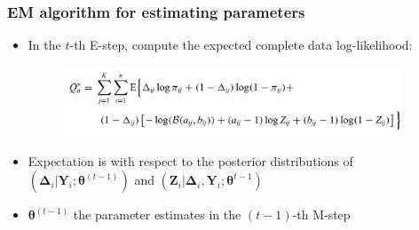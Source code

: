\documentclass{beamer}
\begin{document}
\begin{frame}
\frametitle{EM algorithm for estimating parameters}
\begin{itemize}
  \item In the $t$-th E-step, compute the expected complete data log-likelihood:
  \begin{figure}[!htb]
	\centering
	\includegraphics[width=0.95\textwidth]{img/2022.02.10_Zero_Inflated_generalized_Dirichlet_Multinomial-7ec4e475.png}
\end{figure}
\item Expectation is with respect to the posterior distributions of $(\boldsymbol\Delta_i| \bm{Y}_i; \boldsymbol\theta^{(t-1)})$ and $(\bm{Z}_i | \boldsymbol\Delta_i, \bm{Y}_i; \boldsymbol\theta^{t - 1})$
\item $\boldsymbol\theta^{(t-1)}$ the parameter estimates in the $(t -1)$-th M-step
\end{itemize}
\end{frame}
\end{document}
